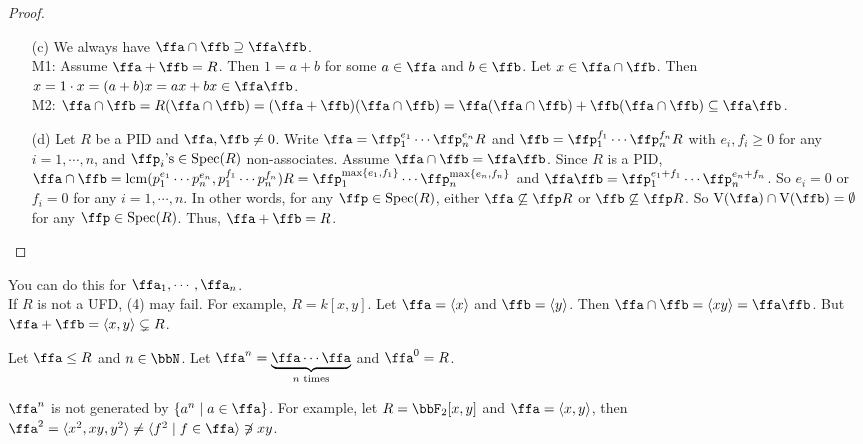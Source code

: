 \begin{proof}
    \begin{enumerate}
        \item [(c)]
            We always have $\ffa \cap \ffb \supseteq \ffa \ffb$. \\
            M1: Assume $\ffa + \ffb = R$. Then $1 = a+b$ for some $a \in \ffa$ and $b \in \ffb$. Let $x \in \ffa \cap \ffb$. Then $x = 1 \cdot x = (a+b)x = ax + bx \in \operatorname{\ffa \ffb}$. \\
            M2: $\ffa \cap \ffb = R(\ffa \cap \ffb) = (\ffa + \ffb)(\ffa \cap \ffb) = \ffa(\ffa \cap \ffb) + \ffb(\ffa \cap \ffb) \subseteq \ffa \ffb$.
        \item[(d)]
            Let $R$ be a PID and $\ffa,\ffb \neq 0$. Write $\ffa = \ffp_1^{e_1} \cdots \ffp_n^{e_n} R$ and $\ffb = \ffp_1^{f_1} \cdots \ffp_n^{f_n}R$ with $e_i,f_i \geq 0$ for any $i = 1,\cdots,n$, and $\ffp_i\text{'s} \in \operatorname{Spec}(R)$ non-associates. Assume $\ffa \cap \ffb = \ffa \ffb$. Since $R$ is a PID, $\ffa \cap \ffb = \operatorname{lcm}(p_1^{e_1} \cdots p_n^{e_n},p_1^{f_1} \cdots p_n^{f_n})R = \ffp_1^{\max\{e_1,f_1\}} \cdots \ffp_n^{\max\{e_n,f_n\}}$ and $\ffa\ffb = \ffp_1^{e_1+f_1} \cdots \ffp_n^{e_n+f_n}$. So $e_i = 0$ or $f_i = 0$ for any $i = 1,\cdots,n$. In other words, for any $\ffp \in \operatorname{Spec}(R)$, either $\ffa \not \subseteq \ffp R$ or $\ffb \not \subseteq \ffp R$. So $\operatorname{V}(\ffa) \cap \operatorname{V}(\ffb) = \emptyset$ for any $\ffp \in \operatorname{Spec}(R)$. Thus, $\ffa + \ffb = R$.
    \end{enumerate}
\end{proof}

\begin{remark}
    You can do this for $\ffa_1,\cdots,\ffa_n$. \\
    If $R$ is not a UFD, (4) may fail. For example, $R = k[x,y]$. Let $\ffa = \langle x \rangle$ and $\ffb = \langle y \rangle$. Then $\ffa \cap \ffb = \langle xy \rangle = \ffa \ffb$. But $\ffa + \ffb = \langle x,y \rangle \subsetneq R$.
\end{remark}

\begin{definition}
    Let $\ffa \leq R$ and $n \in \bbN$. Let $\ffa^n = \underbrace{\ffa \cdots \ffa}_{n\text{ times}}$ and $\ffa^0 = R$.
\end{definition}

\begin{remark}[Warning]
    $\ffa^n$ is not generated by $\{a^n \mid a \in \ffa\}$. For example, let $R = \bbF_2[x,y]$ and $\ffa = \langle x,y \rangle$, then $\ffa^2 = \langle x^2,xy,y^2 \rangle \neq \langle f^2 \mid f \in \ffa \rangle \not \ni xy$.
\end{remark}

